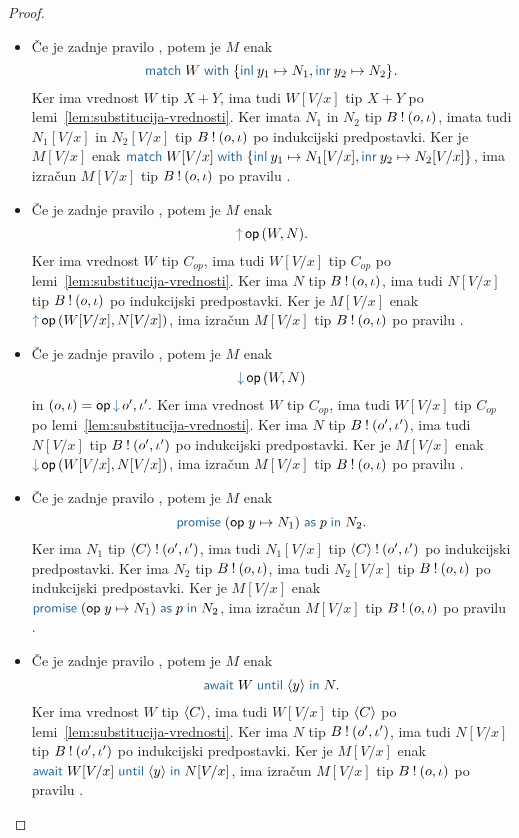 \begin{proof}
\begin{itemize}
		\item Če je zadnje pravilo , potem je $M$ enak $$\tmmatch{W}{\tminl{y_1} \mapsto N_1, \tminr{y_2} \mapsto N_2}.$$
		Ker ima vrednost $W$ tip $X + Y$, ima tudi $W[V/x]$ tip $X + Y$ po lemi~\ref{lem:substitucija-vrednosti}.
		Ker imata $N_1$ in $N_2$ tip $B \mathbin{!} (o, \iota)$, imata tudi $N_1[V/x]$ in $N_2[V/x]$ tip $B \mathbin{!} (o, \iota)$ po indukcijski predpostavki.
		Ker je $M[V/x]$ enak $\tmmatch{W[V/x]}{\tminl{y_1} \mapsto N_1[V/x], \tminr{y_2} \mapsto N_2[V/x]}$, ima izračun $M[V/x]$ tip $B \mathbin{!} (o, \iota)$ po pravilu .
		
		\item Če je zadnje pravilo , potem je $M$ enak $$\tmopout{op}{W}{N}.$$
		Ker ima vrednost $W$ tip $C_{op}$, ima tudi $W[V/x]$ tip $C_{op}$ po lemi~\ref{lem:substitucija-vrednosti}.
		Ker ima $N$ tip $B \mathbin{!} (o, \iota)$, ima tudi $N[V/x]$ tip $B \mathbin{!} (o, \iota)$ po indukcijski predpostavki.
		Ker je $M[V/x]$ enak $\tmopout{op}{W[V/x]}{N[V/x]}$, ima izračun $M[V/x]$ tip $B \mathbin{!} (o, \iota)$ po pravilu .
		
		\item Če je zadnje pravilo , potem je $M$ enak $$\tmopin{op}{W}{N}$$ in $(\o, \i) = \opincomp{op}{\o', \i'}.$
		Ker ima vrednost $W$ tip $C_{op}$, ima tudi $W[V/x]$ tip $C_{op}$ po lemi~\ref{lem:substitucija-vrednosti}.
		Ker ima $N$ tip $B \mathbin{!} (o', \iota')$, ima tudi $N[V/x]$ tip $B \mathbin{!} (o', \iota')$ po indukcijski predpostavki.
		Ker je $M[V/x]$ enak $\tmopin{op}{W[V/x]}{N[V/x]}$, ima izračun $M[V/x]$ tip $B \mathbin{!} (o, \iota)$ po pravilu .
		
		\item Če je zadnje pravilo , potem je $M$ enak $$\tmwith{op}{y}{N_1}{p}{N_2}.$$
		Ker ima $N_1$ tip $\langle C \rangle \mathbin{!} (o', \iota')$, ima tudi $N_1[V/x]$ tip $\langle C \rangle \mathbin{!} (o', \iota')$ po indukcijski predpostavki.
		Ker ima $N_2$ tip $B \mathbin{!} (o, \iota)$, ima tudi $N_2[V/x]$ tip $B \mathbin{!} (o, \iota)$ po indukcijski predpostavki.
		Ker je $M[V/x]$ enak $\tmwith{op}{y}{N_1}{p}{N_2}$, ima izračun $M[V/x]$ tip $B \mathbin{!} (o, \iota)$ po pravilu .
		
		\item Če je zadnje pravilo , potem je $M$ enak $$\tmawait{W}{y}{N}.$$
		Ker ima vrednost $W$ tip $\langle C \rangle$, ima tudi $W[V/x]$ tip $\langle C \rangle$ po lemi~\ref{lem:substitucija-vrednosti}.
		Ker ima $N$ tip $B \mathbin{!} (o', \iota')$, ima tudi $N[V/x]$ tip $B \mathbin{!} (o', \iota')$ po indukcijski predpostavki.
		Ker je $M[V/x]$ enak $\tmawait{W[V/x]}{y}{N[V/x]}$, ima izračun $M[V/x]$ tip $B \mathbin{!} (o, \iota)$ po pravilu .
		

\end{itemize}
\end{proof}
